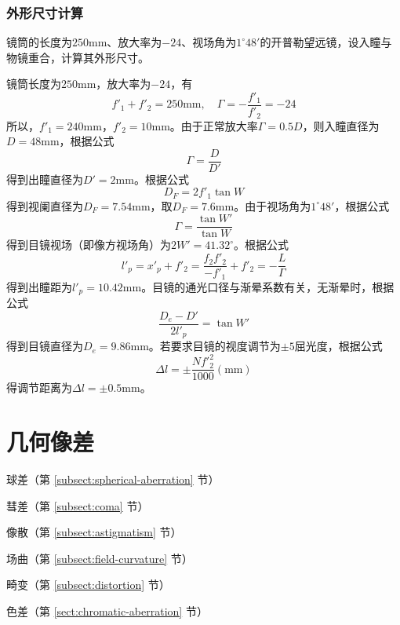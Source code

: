 \documentclass[cn,10pt,chinesefont=founder,math=mtpro2,cite=super,toc=onecol,twoside,openany]{elegantbook}
\begin{document}
\subsection{外形尺寸计算}
\begin{problem}
	\textbf{\color{red}{（重点）}}镜筒的长度为$250\mathrm{mm}$、放大率为$-24$、视场角为$1^{\circ}48'$的开普勒望远镜，设入瞳与物镜重合，计算其外形尺寸。
\end{problem}
\begin{solution}
	镜筒长度为$250\mathrm{mm}$，放大率为$-24$，有
	\begin{equation}
	f'_1+f'_2=250\mathrm{mm},\quad \varGamma=-\frac{f'_1}{f'_2}=-24 \nonumber
	\end{equation}
	所以，$f'_1=240\mathrm{mm}$，$f'_2=10\mathrm{mm}$。由于正常放大率$\varGamma=0.5D$，则入瞳直径为$D=48\mathrm{mm}$，根据公式
	\begin{equation}
	\varGamma=\frac{D}{D'} \nonumber
	\end{equation}
	得到出瞳直径为$D'=2\mathrm{mm}$。根据公式
	\begin{equation}
	D_F=2f'_1\tan W \nonumber
	\end{equation}
	得到视阑直径为$D_F=7.54\mathrm{mm}$，取$D_F=7.6\mathrm{mm}$。由于视场角为$1^{\circ}48'$，根据公式
	\begin{equation}
	\varGamma=\frac{\tan W'}{\tan W} \nonumber
	\end{equation}
	得到目镜视场（即像方视场角）为$2W'=41.32^{\circ}$。根据公式
	\begin{equation}
	l'_p=x'_p+f'_2=\frac{f_2f'_2}{-f'_1}+f'_2=-\frac{L}{\varGamma} \nonumber
	\end{equation}
	得到出瞳距为$l'_p=10.42\mathrm{mm}$。目镜的通光口径与渐晕系数有关，无渐晕时，根据公式
	\begin{equation}
	\frac{D_e-D'}{2l'_p}=\tan W' \nonumber
	\end{equation}
	得到目镜直径为$D_e=9.86\mathrm{mm}$。若要求目镜的视度调节为$\pm5$屈光度，根据公式
	\begin{equation}
	\Delta l=\pm\frac{Nf'^2_2}{1000}(\mathrm{mm}) \nonumber
	\end{equation}
	得调节距离为$\Delta l=\pm0.5\mathrm{mm}$。
\end{solution}

\chapter{几何像差}

\begin{introduction}
	\item 球差（第 \ref{subsect:spherical-aberration} 节）
	\item 彗差（第 \ref{subsect:coma} 节）
	\item 像散（第 \ref{subsect:astigmatism} 节）
	\item 场曲（第 \ref{subsect:field-curvature} 节）
	\item 畸变（第 \ref{subsect:distortion} 节）
	\item 色差（第 \ref{sect:chromatic-aberration} 节）
\end{introduction}
\end{document}

